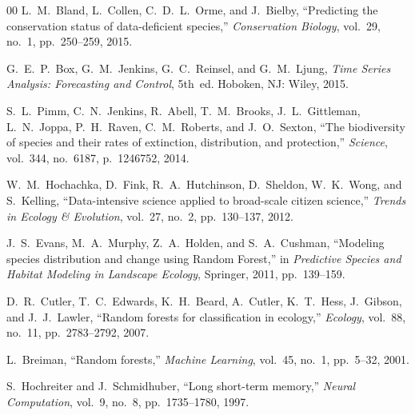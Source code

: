 \documentclass[conference]{IEEEtran}
\begin{document}
\begin{thebibliography}{00}
L.~M.~Bland, L.~Collen, C.~D.~L.~Orme, and J.~Bielby, ``Predicting the conservation status of data-deficient species,'' \textit{Conservation Biology}, vol.~29, no.~1, pp.~250--259, 2015.

G.~E.~P.~Box, G.~M.~Jenkins, G.~C.~Reinsel, and G.~M.~Ljung, \textit{Time Series Analysis: Forecasting and Control}, 5th~ed. Hoboken, NJ: Wiley, 2015.

S.~L.~Pimm, C.~N.~Jenkins, R.~Abell, T.~M.~Brooks, J.~L.~Gittleman, L.~N.~Joppa, P.~H.~Raven, C.~M.~Roberts, and J.~O.~Sexton, ``The biodiversity of species and their rates of extinction, distribution, and protection,'' \textit{Science}, vol.~344, no.~6187, p.~1246752, 2014.

W.~M.~Hochachka, D.~Fink, R.~A.~Hutchinson, D.~Sheldon, W.~K.~Wong, and S.~Kelling, ``Data-intensive science applied to broad-scale citizen science,'' \textit{Trends in Ecology \& Evolution}, vol.~27, no.~2, pp.~130--137, 2012.

J.~S.~Evans, M.~A.~Murphy, Z.~A.~Holden, and S.~A.~Cushman, ``Modeling species distribution and change using Random Forest,'' in \textit{Predictive Species and Habitat Modeling in Landscape Ecology}, Springer, 2011, pp.~139--159.

D.~R.~Cutler, T.~C.~Edwards, K.~H.~Beard, A.~Cutler, K.~T.~Hess, J.~Gibson, and J.~J.~Lawler, ``Random forests for classification in ecology,'' \textit{Ecology}, vol.~88, no.~11, pp.~2783--2792, 2007.

L.~Breiman, ``Random forests,'' \textit{Machine Learning}, vol.~45, no.~1, pp.~5--32, 2001.

S.~Hochreiter and J.~Schmidhuber, ``Long short-term memory,'' \textit{Neural Computation}, vol.~9, no.~8, pp.~1735--1780, 1997.

\end{thebibliography}
\end{document}
